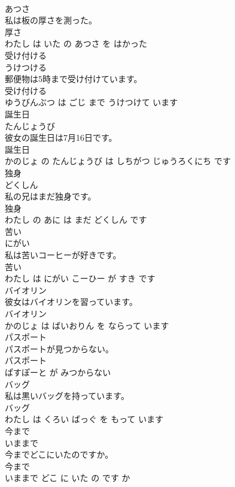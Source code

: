 \documentclass[8pt]{extreport}
\begin{document}
\begin{CJK}{UTF8}{min}
\\	あつさ			
\\	私は板の厚さを測った。	
\\	厚さ 
\\	わたし は いた の あつさ を はかった			
\\	受け付ける	
\\	うけつける			
\\	郵便物は5時まで受け付けています。	
\\	受け付ける 
\\	ゆうびんぶつ は ごじ まで うけつけて います			
\\	誕生日	
\\	たんじょうび			
\\	彼女の誕生日は7月16日です。	
\\	誕生日 
\\	かのじょ の たんじょうび は しちがつ じゅうろくにち です			
\\	独身	
\\	どくしん			
\\	私の兄はまだ独身です。	
\\	独身 
\\	わたし の あに は まだ どくしん です			
\\	苦い	
\\	にがい			
\\	私は苦いコーヒーが好きです。	
\\	苦い 
\\	わたし は にがい こーひー が すき です			
\\	バイオリン	
\\	彼女はバイオリンを習っています。	
\\	バイオリン 
\\	かのじょ は ばいおりん を ならって います			
\\	パスポート	
\\	パスポートが見つからない。	
\\	パスポート 
\\	ぱすぽーと が みつからない			
\\	バッグ	
\\	私は黒いバッグを持っています。	
\\	バッグ 
\\	わたし は くろい ばっぐ を もって います			
\\	今まで	
\\	いままで			
\\	今までどこにいたのですか。	
\\	今まで 
\\	いままで どこ に いた の です か			

\end{CJK}
\end{document}
